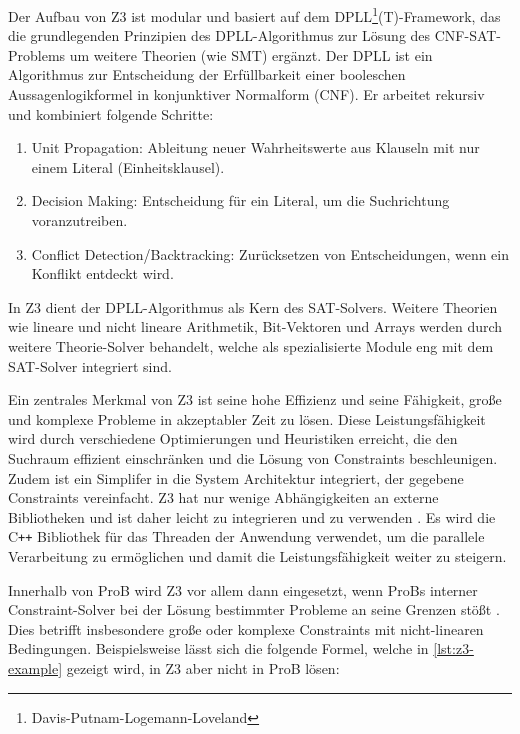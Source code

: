Der Aufbau von Z3 ist modular und basiert auf dem DPLL\footnote{Davis-Putnam-Logemann-Loveland}(T)-Framework,
das die grundlegenden Prinzipien des DPLL-Algorithmus zur Lösung des CNF-SAT-Problems um weitere Theorien (wie SMT) ergänzt.
Der DPLL ist ein Algorithmus zur Entscheidung der Erfüllbarkeit einer booleschen Aussagenlogikformel in konjunktiver Normalform (CNF).
Er arbeitet rekursiv und kombiniert folgende Schritte:
\begin{enumerate}
    \item Unit Propagation: Ableitung neuer Wahrheitswerte aus Klauseln mit nur einem Literal (Einheitsklausel).
    \item Decision Making: Entscheidung für ein Literal, um die Suchrichtung voranzutreiben.
    \item Conflict Detection/Backtracking: Zurücksetzen von Entscheidungen, wenn ein Konflikt entdeckt wird.
\end{enumerate}    

In Z3 dient der DPLL-Algorithmus als Kern des SAT-Solvers.
Weitere Theorien wie lineare und nicht lineare Arithmetik, Bit-Vektoren und Arrays werden durch weitere Theorie-Solver behandelt,
welche als spezialisierte Module eng mit dem SAT-Solver integriert sind.

Ein zentrales Merkmal von Z3 ist seine hohe Effizienz und seine Fähigkeit,
große und komplexe Probleme in akzeptabler Zeit zu lösen.
Diese Leistungsfähigkeit wird durch verschiedene Optimierungen und Heuristiken erreicht,
die den Suchraum effizient einschränken und die Lösung von Constraints beschleunigen.
Zudem ist ein Simplifer in die System Architektur integriert, der gegebene Constraints vereinfacht.
Z3 hat nur wenige Abhängigkeiten an externe Bibliotheken und ist daher leicht zu integrieren und zu verwenden \cite{z3prover-github}.
Es wird die C\texttt{++} Bibliothek für das Threaden der Anwendung verwendet, um die parallele Verarbeitung zu ermöglichen und damit die Leistungsfähigkeit weiter zu steigern. 

Innerhalb von ProB wird Z3 vor allem dann eingesetzt, wenn ProBs interner Constraint-Solver bei der Lösung bestimmter Probleme an seine Grenzen stößt \cite{10.1007/978-3-319-33693-0_23}.
Dies betrifft insbesondere große oder komplexe Constraints mit nicht-linearen Bedingungen.
Beispielsweise lässt sich die folgende Formel, welche in \cref{lst:z3-example} gezeigt wird, in Z3 aber nicht in ProB lösen:

